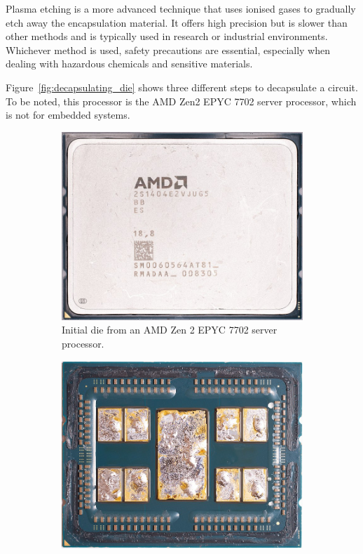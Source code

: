 Plasma etching is a more advanced technique that uses ionised gases to gradually etch away the encapsulation material. It offers high precision but is slower than other methods and is typically used in research or industrial environments. Whichever method is used, safety precautions are essential, especially when dealing with hazardous chemicals and sensitive materials.

Figure~\ref{fig:decapsulating_die} shows three different steps to decapsulate a circuit. To be noted, this processor is the AMD Zen2 EPYC 7702 server processor, which is not for embedded systems.

\begin{figure}[ht]
    \centering
    \begin{subfigure}[b]{0.3\textwidth}
        \includegraphics[width=\textwidth]{c2_soa/img/epyc_7702_initial.jpg}
        \caption{Initial die from an AMD Zen 2 EPYC 7702 server processor.}
        \label{fig:initial_die}
    \end{subfigure}
    \hfill
    \begin{subfigure}[b]{0.3\textwidth}
        \includegraphics[width=\textwidth]{c2_soa/img/epyc_7702_delidding.jpg}

\end{subfigure}
\end{figure}
